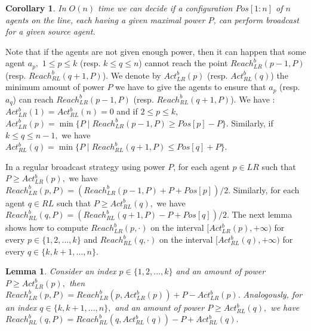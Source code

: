 \documentclass{article}
\newtheorem{lemma}{Lemma}
\newtheorem{corollary}{Corollary}
\newcommand\rblr{Reach_{LR}^b\xspace}
\newcommand\rbrl{Reach_{RL}^b\xspace}
\newcommand\abrl{Act_{RL}^b\xspace}
\newcommand\ablr{Act_{LR}^b\xspace}
\newcommand\broadcast{broadcast\xspace}
\begin{document}
\begin{corollary}
In $O(n)$ time we can decide if a configuration $Pos[1:n]$ of $n$ agents on the
line, each having a given maximal power $P$, can perform
{\broadcast} for a given source agent.
\end{corollary}



Note that if the agents are not given enough power, then it can happen
that some agent $a_p,$ $1 \le p\le k$ (resp. $k \le q \le n$) cannot reach the
point $\rblr(p-1,P)$ (resp. $\rbrl(q+1,P)$). We denote by
$\ablr(p)$ (resp. $\abrl(q)$) the minimum amount of power $P$ we have to give the agents
to ensure that $a_p$ (resp. $a_q$) can reach $\rblr(p-1,P)$ (resp. $\rbrl(q+1,P)$). We have : $\ablr(1) = \abrl(n) = 0$ and if $2 \le p\le k,$
$\ablr(p) = \min \{P\mid \rblr(p-1,P) \geq Pos[p]-P\}$. 
Similarly, if $k \le q \le n-1,$ we have $\abrl(q) = \min \{P \mid
\rbrl(q+1,P) \leq Pos[q]+P\}$.


In a regular broadcast strategy using power $P$, for each agent $p \in LR$ such that $P
\geq \ablr(p),$ we have $\rblr(p,P)=(\rblr(p-1,P) + P + Pos[p])/2$.
Similarly, for each agent $q \in RL$ such that $P
\geq \abrl(q),$ we have $\rbrl(q,P)=(\rbrl(q+1,P) - P + Pos[q])/2$.
The next lemma shows how to compute $\rblr(p,\cdot)$ on the interval 
$[\ablr(p),+\infty)$ for every $p\in \{1,2,\hdots,k\}$ and
$\rbrl(q,\cdot)$ on the interval $[\abrl(q),+\infty)$ for every $q\in
\{k,k+1,\hdots,n\}.$

\begin{lemma}\label{lem-eqn-reach-b}
Consider an index $p\in \{1,2,\hdots,k\}$ and an amount of power 
$P\ge \ablr(p),$ then $\rblr(p,P) = \rblr(p,\ablr(p)) + P - \ablr(p).$
Analogously, for an index $q\in \{k,k+1,\hdots,n\},$ and an amount of 
power $P\ge \abrl(q),$ we have $\rbrl(q,P) = \rbrl(q,\abrl(q)) - P + \abrl(q).$
\end{lemma}
\end{document}
